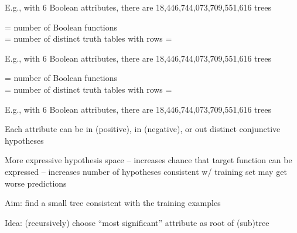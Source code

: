 \documentclass{article}
\begin{document}
\begin{huge}
E.g., with 6 Boolean attributes, there are 18,446,744,073,709,551,616 trees



= number of Boolean functions\\
= number of distinct truth tables with  rows = 

E.g., with 6 Boolean attributes, there are 18,446,744,073,709,551,616 trees





= number of Boolean functions\\
= number of distinct truth tables with  rows = 

E.g., with 6 Boolean attributes, there are 18,446,744,073,709,551,616 trees


Each attribute can be in (positive), in (negative), or out\nl
\mat{$\implies$}  distinct conjunctive hypotheses

More expressive hypothesis space\al
 -- increases chance that target function can be expressed \quad\smiley\al
 -- increases number of hypotheses consistent w/ training set\nl
    \mat{$\implies$} may get worse predictions\quad\frowny



Aim: find a small tree consistent with the training examples

Idea: (recursively) choose ``most significant'' attribute as root of (sub)tree





\end{huge}
\end{document}
